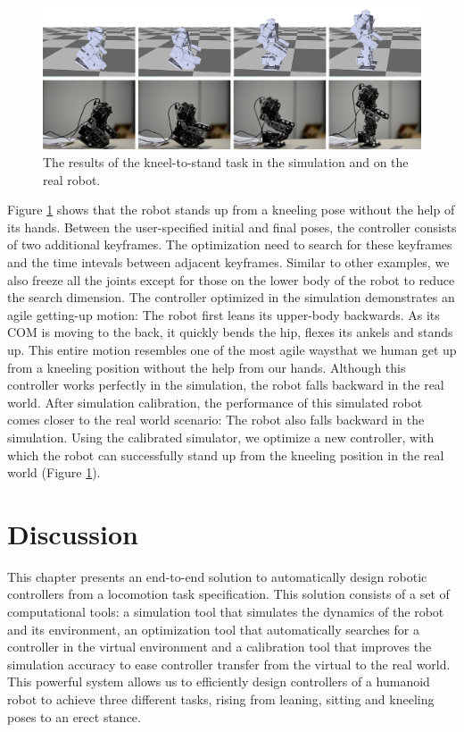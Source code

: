 \begin{figure}[!t]
  \centering
  \includegraphics[width=\textwidth]{figures/kneel2Stand}
  \caption{The results of the kneel-to-stand task in the simulation and on the real robot.}
  \label{fig:kneel2Stand}
\end{figure}

Figure \ref{fig:kneel2Stand} shows that the robot stands up from a kneeling pose without the help of its hands. Between the user-specified initial and final poses, the controller consists of two additional keyframes. The optimization need to search for these keyframes and the time intevals between adjacent keyframes. Similar to other examples, we also freeze all the joints except for those on the lower body of the robot to reduce the search dimension. The controller optimized in the simulation demonstrates an agile getting-up motion: The robot first leans its upper-body backwards. As its COM is moving to the back, it quickly bends the hip, flexes its ankels and stands up. This entire motion resembles one of the most agile waysthat we human get up from a kneeling position without the help from our hands. Although this controller works perfectly in the simulation, the robot falls backward in the real world. After simulation calibration, the performance of this simulated robot comes closer to the real world scenario: The robot also falls backward in the simulation. Using the calibrated simulator, we optimize a new controller, with which the robot can successfully stand up from the kneeling position in the real world (Figure \ref{fig:kneel2Stand}).

\section{Discussion}

This chapter presents an end-to-end solution to automatically design robotic controllers from a locomotion task specification. This solution consists of a set of computational tools: a simulation tool that simulates the dynamics of the robot and its environment, an optimization tool that automatically searches for a controller in the virtual environment and a calibration tool that improves the simulation accuracy to ease controller transfer from the virtual to the real world. This powerful system allows us to efficiently design controllers of a humanoid robot to achieve three different tasks, rising from leaning, sitting and kneeling poses to an erect stance.

